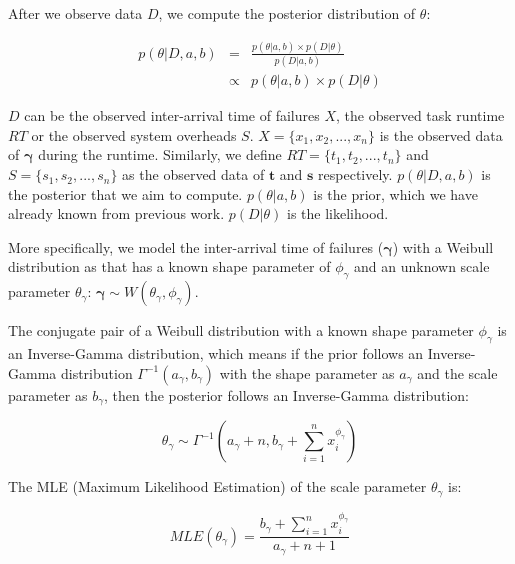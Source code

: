After we observe data $D$, we compute the posterior distribution of $\theta$:

\begin{eqnarray*}
	\displaystyle  
	p(\theta|D, a, b)&=&\frac{p(\theta|a, b)\times p(D|\theta)}{p(D|a, b)}\nonumber  \\
	&\propto&p(\theta|a, b)\times p(D|\theta)\nonumber 
\end{eqnarray*}

$D$ can be the observed inter-arrival time of failures $X$, the observed task runtime $RT$ or the observed system overheads $S$. 
$X=\{x_1, x_2, ..., x_n\}$ is the observed data of $\bm\gamma$ during the runtime. Similarly, we define $RT=\{t_1, t_2, ..., t_n\}$ and $S=\{s_1, s_2, ..., s_n\}$ as the observed data of $\bm t$ and $\bm s$ respectively. $p(\theta|D,a, b)$ is the posterior that we aim to compute. $p(\theta|a, b)$ is the prior, which we have already known from previous work. $p(D|\theta)$ is the likelihood. 



More specifically, we model the inter-arrival time of failures ($\bm\gamma$) with a Weibull distribution as \cite{Schroeder2006} that has a known shape parameter of $\phi_{\gamma}$ and an unknown scale parameter $\theta_{\gamma}$: $\bm\gamma\sim W(\theta_{\gamma}, \phi_{\gamma})$. 

The conjugate pair of a Weibull distribution with a known shape parameter $\phi_{\gamma}$ is an Inverse-Gamma distribution, which means if the prior follows an Inverse-Gamma distribution $\Gamma^{-1}(a_{\gamma}, b_{\gamma})$ with the shape parameter as $a_{\gamma}$ and the scale parameter as $b_{\gamma}$, then the posterior follows an Inverse-Gamma distribution:

\begin{equation}
\label{eq:theta_1}
\theta_{\gamma}\sim\Gamma^{-1}(a_{\gamma}+n,\displaystyle b_{\gamma}+\sum_{i=1}^n{x_i^{\phi_{\gamma}}})
 \end{equation}

The MLE (Maximum Likelihood Estimation) of the scale parameter $\theta_{\gamma}$ is:

\begin{equation}
MLE(\theta_{\gamma})=\displaystyle\frac{b_{\gamma}+\displaystyle\sum_{i=1}^n{x_i^{\phi_{\gamma}}}}{a_{\gamma}+n+1}
\end{equation}

